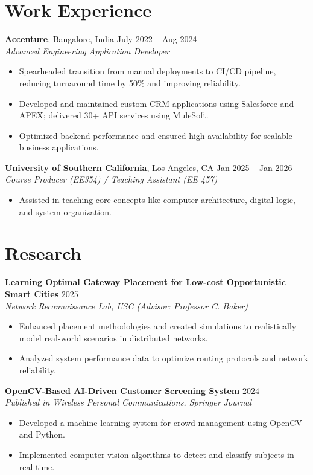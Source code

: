 \documentclass[letterpaper,10pt]{article}
\begin{document}
\section*{Work Experience}

\textbf{Accenture}, Bangalore, India \hfill July 2022 -- Aug 2024 \\
\textit{Advanced Engineering Application Developer}
\begin{itemize}[leftmargin=*,noitemsep,topsep=-2pt]
    \item Spearheaded transition from manual deployments to CI/CD pipeline, reducing turnaround time by 50\% and improving reliability.
    \item Developed and maintained custom CRM applications using Salesforce and APEX; delivered 30+ API services using MuleSoft.
    \item Optimized backend performance and ensured high availability for scalable business applications.
\end{itemize}

\textbf{University of Southern California}, Los Angeles, CA \hfill Jan 2025 -- Jan 2026 \\
\textit{Course Producer (EE354) / Teaching Assistant (EE 457)}
\begin{itemize}[leftmargin=*,noitemsep,topsep=-2pt]
    \item Assisted in teaching core concepts like computer architecture, digital logic, and system organization.
\end{itemize}

\section*{Research}
\textbf{Learning Optimal Gateway Placement for Low-cost Opportunistic Smart Cities} \hfill 2025 \\
\textit{Network Reconnaissance Lab, USC (Advisor: Professor C. Baker)}
\begin{itemize}[leftmargin=*,noitemsep,topsep=-2pt]
    \item Enhanced placement methodologies and created simulations to realistically model real-world scenarios in distributed networks.
    \item Analyzed system performance data to optimize routing protocols and network reliability.
\end{itemize}

\textbf{OpenCV-Based AI-Driven Customer Screening System} \hfill 2024 \\
\textit{Published in Wireless Personal Communications, Springer Journal}
\begin{itemize}[leftmargin=*,noitemsep,topsep=-2pt]
    \item Developed a machine learning system for crowd management using OpenCV and Python.
    \item Implemented computer vision algorithms to detect and classify subjects in real-time.
\end{itemize}
\end{document}
